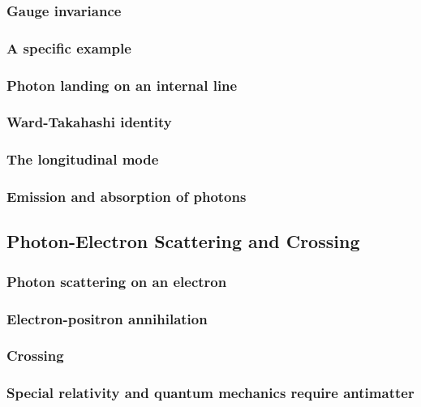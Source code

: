 \documentclass{book}
\theoremstyle{definition}
\begin{document}
\subsubsection{Gauge invariance}
\subsubsection{A specific example}
\subsubsection{Photon landing on an internal line}
\subsubsection{Ward-Takahashi identity}
\subsubsection{The longitudinal mode}
\subsubsection{Emission and absorption of photons
}



\newpage

\subsection{Photon-Electron Scattering and Crossing}

\subsubsection{Photon scattering on an electron}
\subsubsection{Electron-positron annihilation}
\subsubsection{Crossing}
\subsubsection{Special relativity and quantum mechanics require antimatter}
\end{document}
